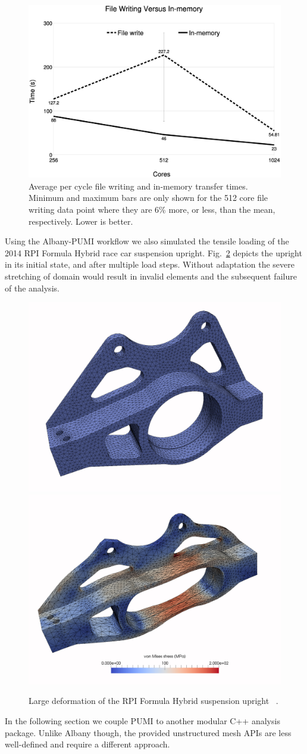 \begin{figure} \centering
  \includegraphics[width=.7\textwidth]{results/albany/compare.eps}
  \caption{
    Average per cycle file writing and in-memory transfer times.  Minimum and
    maximum bars are only shown for the 512 core file writing data point where
    they are 6\% more, or less, than the mean, respectively. Lower is better.}
  \label{fig:inmem-alb}
\end{figure}

Using the Albany-PUMI workflow we also simulated the tensile loading of the 2014
RPI Formula Hybrid race car suspension upright.
Fig.~\ref{fig:alb-upright} depicts the
upright in its initial state, and after multiple load steps.
Without adaptation the severe stretching of domain would result in invalid
elements and the subsequent failure of the analysis.

\begin{figure} \centering
  \includegraphics[width=.49\textwidth]{figures/upright/upright-initial.png}
  \includegraphics[width=.49\textwidth]{figures/upright/upright-final.png}
  \caption{
    Large deformation of the RPI Formula Hybrid suspension upright
    ~\cite{albanyTutorialATPESC2014}.
  }
  \label{fig:alb-upright}
\end{figure}

In the following section we couple PUMI to another modular C++ analysis
package.
Unlike Albany though, the provided unstructured mesh APIs are less
well-defined and require a different approach.
